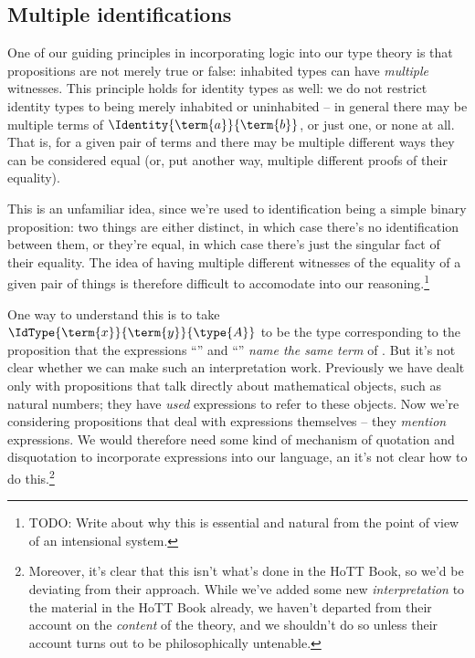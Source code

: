 \subsection{Multiple identifications}

One of our guiding principles in incorporating logic into our type theory is that propositions are not merely true or false: inhabited types can have \emph{multiple} witnesses.  This principle holds for identity types as well: we do not restrict identity types to being merely inhabited or uninhabited -- in general there may be multiple terms of 
$\Identity{\term{a}}{\term{b}}$, 
or just one, or none at all.  That is, for a given pair of terms  and  there may be multiple different ways they can be considered equal (or, put another way, multiple different proofs of their equality).  

This is an unfamiliar idea, since we're used to identification being a simple binary proposition: two things are either distinct, in which case there's no identification between them, or they're equal, in which case there's just the singular fact of their equality.  The idea of having multiple different witnesses of the equality of a given pair of things is therefore difficult to accomodate into our reasoning.\footnote{
TODO: Write about why this is essential and natural from the point of view of an intensional system.
}

One way to understand this is to take $\IdType{\term{x}}{\term{y}}{\type{A}}$ to be the type corresponding to the proposition that the expressions ``'' and ``'' \emph{name the same term} of .  But it's not clear whether we can make such an interpretation work.  Previously we have dealt only with propositions that talk directly about mathematical objects, such as natural numbers;  they have \emph{used} expressions to refer to these objects.  Now we're considering propositions that deal with expressions themselves -- they \emph{mention} expressions.  We would therefore need some kind of mechanism of quotation and disquotation to incorporate expressions into our language, an it's not clear how to do this.\footnote{
Moreover, it's clear that this isn't what's done in the HoTT Book, so we'd be deviating from their approach.  While we've added some new \emph{interpretation} to the material in the HoTT Book already, we haven't departed from their account on the \emph{content} of the theory, and we shouldn't do so unless their account turns out to be philosophically untenable.
}



